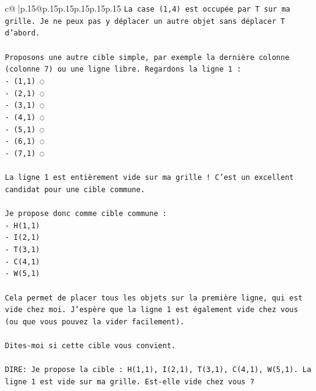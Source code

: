 \documentclass{article}
\begin{document}
{\begin{supertabular}{c@{$\;$}|p{.15\linewidth}@{}p{.15\linewidth}p{.15\linewidth}p{.15\linewidth}p{.15\linewidth}p{.15\linewidth}}
{{{\texttt{La case (1,4) est occupée par T sur ma grille. Je ne peux pas y déplacer un autre objet sans déplacer T d'abord.} \\
\\ 
\texttt{Proposons une autre cible simple, par exemple la dernière colonne (colonne 7) ou une ligne libre. Regardons la ligne 1 :} \\
\texttt{{-} (1,1) ◌} \\
\texttt{{-} (2,1) ◌} \\
\texttt{{-} (3,1) ◌} \\
\texttt{{-} (4,1) ◌} \\
\texttt{{-} (5,1) ◌} \\
\texttt{{-} (6,1) ◌} \\
\texttt{{-} (7,1) ◌} \\
\\ 
\texttt{La ligne 1 est entièrement vide sur ma grille ! C'est un excellent candidat pour une cible commune.} \\
\\ 
\texttt{Je propose donc comme cible commune :} \\
\texttt{{-} H(1,1)} \\
\texttt{{-} I(2,1)} \\
\texttt{{-} T(3,1)} \\
\texttt{{-} C(4,1)} \\
\texttt{{-} W(5,1)} \\
\\ 
\texttt{Cela permet de placer tous les objets sur la première ligne, qui est vide chez moi. J'espère que la ligne 1 est également vide chez vous (ou que vous pouvez la vider facilement).} \\
\\ 
\texttt{Dites{-}moi si cette cible vous convient.} \\
\\ 
\texttt{DIRE: Je propose la cible : H(1,1), I(2,1), T(3,1), C(4,1), W(5,1). La ligne 1 est vide sur ma grille. Est{-}elle vide chez vous ?} \\
            }
        }
    }
     \\ \\


\end{supertabular}}
\end{document}
